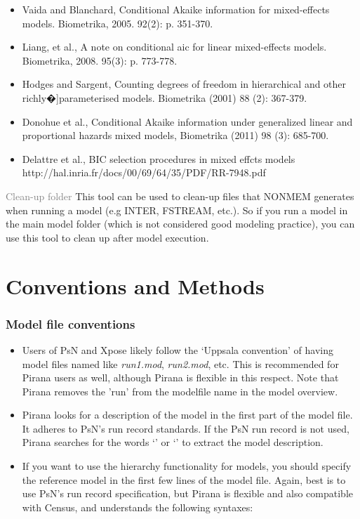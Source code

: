 {{{{\begin {description}
\scriptsize
\begin{itemize}
\item Vaida and Blanchard, Conditional Akaike information for
mixed-effects models. Biometrika, 2005. 92(2): p. 351-370.
\item Liang, et al., A note on conditional aic for linear
mixed-effects models. Biometrika, 2008. 95(3): p. 773-778.
\item Hodges and Sargent, Counting degrees of freedom in hierarchical
  and other richly�]parameterised models. Biometrika (2001) 88 (2): 367-379.
\item Donohue et al., Conditional Akaike information under generalized
  linear and proportional hazards mixed models, Biometrika (2011) 98
  (3): 685-700.
\item Delattre et al., BIC selection procedures in mixed effcts
  models \\ http://hal.inria.fr/docs/00/69/64/35/PDF/RR-7948.pdf
\end{itemize}
\normalsize

\item{\textcolor{Grey}{Clean-up folder}} This tool can be used to
  clean-up files that NONMEM generates when running a model (e.g
  INTER, FSTREAM, etc.). So if you run a model in the main model
  folder (which is not considered good modeling practice),
  you can use this tool to clean up after model execution.

\end{description}

\clearpage
\section{Conventions and Methods}
\subsubsection{Model file conventions}

\begin{itemize}
\item Users of PsN and Xpose likely follow the `Uppsala convention' of
  having model files named like \textit{run1.mod}, \textit{run2.mod},
  etc. This is recommended for Pirana users as well, although
  Pirana is flexible in this respect. Note that Pirana removes
  the 'run' from the modelfile name in the model overview.
\item Pirana looks for a description of the model in the first part of
  the model file. It adheres to PsN's run record standards.
  If the PsN run record is not used,
  Pirana searches for the words `' \normalfont or
  `' \normalfont to extract the model
  description.
\item If you want to use the hierarchy functionality for models, you
  should specify the reference model in the first few lines of the
  model file. Again, best is to use PsN's run record specification, but
  Pirana is flexible and also compatible with Census, and
  understands the following syntaxes:


\end{itemize}}}}}
